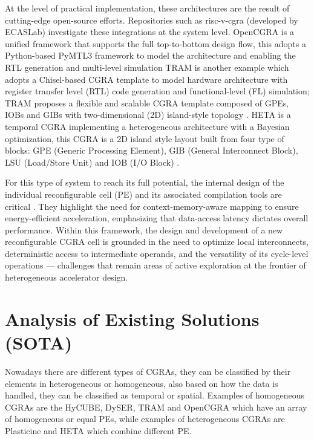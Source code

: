 \documentclass[conference]{IEEEtran}
\begin{document}
At the level of practical implementation, these architectures are the result of cutting-edge open-source efforts. 
Repositories such as risc-v-cgra (developed by ECASLab) investigate these integrations at the system level.
OpenCGRA is a unified framework that supports the full top-to-bottom design flow, this adopts a Python-based PyMTL3 framework to model the architecture and enabling the RTL generation and multi-level simulation \cite{OpenCGRA}
TRAM is another example which adopts a Chisel-based CGRA template to model hardware architecture with register transfer level (RTL) code generation and functional-level (FL) simulation; TRAM proposes a flexible and scalable CGRA template composed of GPEs, IOBs and GIBs with two-dimensional (2D) island-style topology \cite{TRAM}. 
HETA is a temporal CGRA implementing a heterogeneous architecture with a Bayesian optimization, this CGRA is a 2D island style layout built from four type of blocks: GPE (Generic Processing Element), GIB (General Interconnect Block), LSU (Load/Store Unit) and IOB (I/O Block) \cite{HETA}. 

For this type of system to reach its full potential, the internal design of the individual reconfigurable cell (PE) and its associated compilation tools are critical \cite{satyajit}. 
They highlight the need for context-memory-aware mapping to ensure energy-efficient acceleration, emphasizing that data-access latency dictates overall performance. 
Within this framework, the design and development of a new reconfigurable CGRA cell is grounded in the need to optimize local interconnects, deterministic access to intermediate operands, and the versatility of its cycle-level operations — challenges that remain areas of active exploration at the frontier of heterogeneous accelerator design.



\section{Analysis of Existing Solutions (SOTA)} %
\label{sec:sota}

Nowadays there are different types of CGRAs, they can be classified by their elements in heterogeneous or homogeneous, also based on how the data is handled, they can be classified as temporal or spatial. 
Examples of homogeneous CGRAs are the HyCUBE, DySER, TRAM and OpenCGRA \cite{Blocks2022, TRAM, OpenCGRA} which have an array of homogeneous or equal PEs, while examples of heterogeneous CGRAs are Plasticine and HETA \cite{plasticine2017, HETA} which combine different PE.
\end{document}
